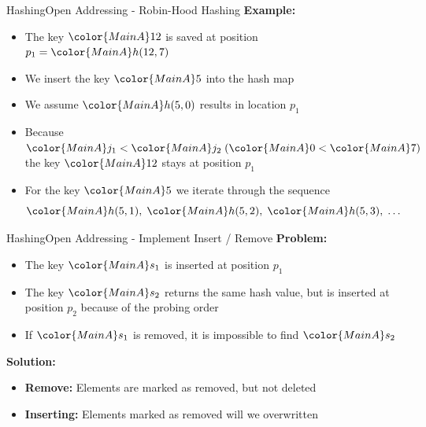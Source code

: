 
\begin{frame}{Hashing}{Open Addressing - Robin-Hood Hashing}
  \textbf{Example:}
  \begin{itemize}
    \item
      The key ${\color{MainA}12}$ is saved at position
      $p_1 = {\color{MainA}h(12, 7)}$
    \item
      We insert the key ${\color{MainA}5}$ into the hash map
    \item
      We assume ${\color{MainA}h(5,0)}$ results in location $p_1$
    \item
      Because
      \begin{math}
        {\color{MainA}j_1} < {\color{MainA}j_2} \;
        ({\color{MainA}0} < {\color{MainA}7})
      \end{math}
      the key ${\color{MainA}12}$ stays at position $p_1$
    \item
      For the key ${\color{MainA}5}$ we iterate through the 
      sequence
      \begin{displaymath}
        {\color{MainA}h(5, 1)} ,\;
        {\color{MainA}h(5, 2)} ,\;
        {\color{MainA}h(5, 3)} ,\;
        \dots
      \end{displaymath}
  \end{itemize}
\end{frame}


\begin{frame}{Hashing}{Open Addressing - Implement Insert / Remove}
  \textbf{Problem:}
  \begin{itemize}
    \item
      The key ${\color{MainA}s_1}$ is inserted at position $p_1$
    \item
      The key ${\color{MainA}s_2}$ returns the same hash value,
      but is inserted at position $p_2$ because of the probing order
    \item
      If ${\color{MainA}s_1}$ is removed, it is impossible to find
      ${\color{MainA}s_2}$
  \end{itemize}
  \vspace{1.0em}
  \textbf{Solution:}
  \begin{itemize}
    \item<3->
      \textbf{Remove:}
      Elements are marked as removed, but not deleted
    \item<4->
      \textbf{Inserting:}
      Elements marked as removed will we overwritten
  \end{itemize}
\end{frame}

